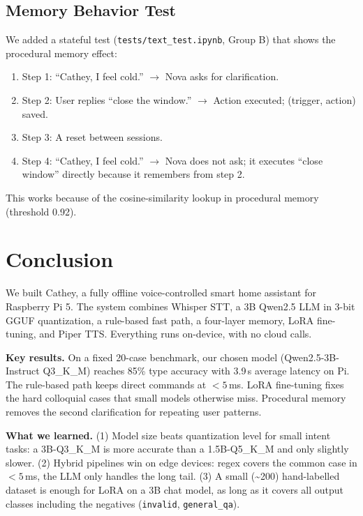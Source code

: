 \documentclass[conference]{IEEEtran}
\begin{document}
\subsection{Memory Behavior Test}

We added a stateful test (\texttt{tests/text\_test.ipynb}, Group B) that shows the procedural memory effect:
\begin{enumerate}
    \item Step 1: ``Cathey, I feel cold.'' $\rightarrow$ Nova asks for clarification.
    \item Step 2: User replies ``close the window.'' $\rightarrow$ Action executed; (trigger, action) saved.
    \item Step 3: A reset between sessions.
    \item Step 4: ``Cathey, I feel cold.'' $\rightarrow$ Nova does not ask; it executes ``close window'' directly because it remembers from step 2.
\end{enumerate}
This works because of the cosine-similarity lookup in procedural memory (threshold 0.92).

\section{Conclusion}
\label{sec:conclusion}

We built Cathey, a fully offline voice-controlled smart home assistant for Raspberry Pi 5. The system combines Whisper STT, a 3B Qwen2.5 LLM in 3-bit GGUF quantization, a rule-based fast path, a four-layer memory, LoRA fine-tuning, and Piper TTS. Everything runs on-device, with no cloud calls.

\textbf{Key results.} On a fixed 20-case benchmark, our chosen model (Qwen2.5-3B-Instruct Q3\_K\_M) reaches 85\% type accuracy with 3.9\,s average latency on Pi. The rule-based path keeps direct commands at $<5$\,ms. LoRA fine-tuning fixes the hard colloquial cases that small models otherwise miss. Procedural memory removes the second clarification for repeating user patterns.

\textbf{What we learned.} (1) Model size beats quantization level for small intent tasks: a 3B-Q3\_K\_M is more accurate than a 1.5B-Q5\_K\_M and only slightly slower. (2) Hybrid pipelines win on edge devices: regex covers the common case in $<5$\,ms, the LLM only handles the long tail. (3) A small (\textasciitilde 200) hand-labelled dataset is enough for LoRA on a 3B chat model, as long as it covers all output classes including the negatives (\texttt{invalid}, \texttt{general\_qa}).
\end{document}
